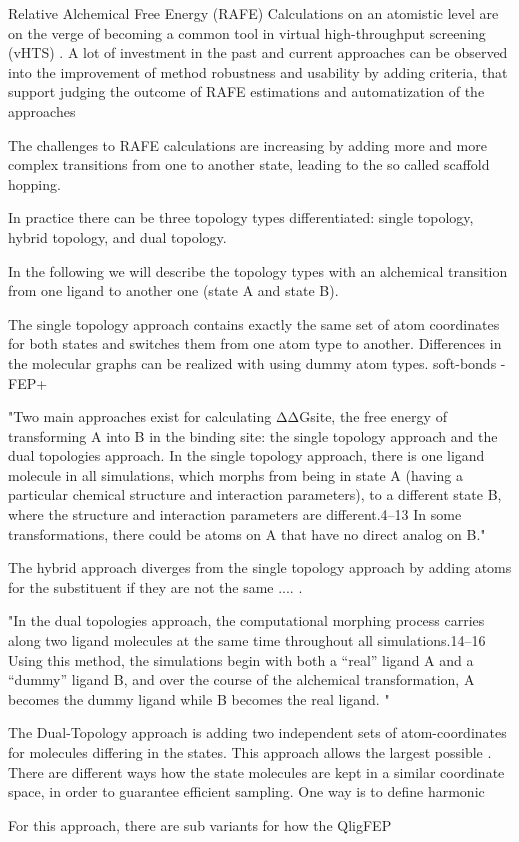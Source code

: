 Relative Alchemical Free Energy (RAFE) Calculations on an atomistic level are on the verge of becoming a common tool in virtual high-throughput screening (vHTS) \cite{Cournia2017}. 
A lot of investment in the past and current approaches can be observed into the improvement of method robustness and usability by adding criteria, that support judging the outcome of RAFE estimations and automatization of the approaches

The challenges to RAFE calculations are increasing by adding more and more complex transitions from one to another state, leading to the so called scaffold hopping. 

In practice there can be three topology types differentiated: single topology, hybrid topology, and dual topology.



In the following we will describe the topology types with an alchemical transition from one ligand to another one (state A and state B).

The single topology approach contains exactly the same set of atom coordinates for both states and switches them from one atom type to another. Differences in the molecular graphs can be realized with using dummy atom types.
soft-bonds - FEP+ \cite{Wang2017, Yu2017, Shivakumar2010}

"Two main approaches exist for calculating ΔΔGsite, the free energy of transforming A into B in the binding site: the single topology approach and the dual topologies approach. In the single topology approach, there is one ligand molecule in all simulations, which morphs from being in state A (having a particular chemical structure and interaction parameters), to a different state B, where the structure and interaction parameters are different.4–13 In some transformations, there could be atoms on A that have no direct analog on B." \cite{Rocklin2013}

The hybrid approach diverges from the single topology approach by adding atoms for the substituent if they are not the same .... \cite{}.

"In the dual topologies approach, the computational morphing process carries along two ligand molecules at the same time throughout all simulations.14–16 Using this method, the simulations begin with both a “real” ligand A and a “dummy” ligand B, and over the course of the alchemical transformation, A becomes the dummy ligand while B becomes the real ligand. "
\cite{Rocklin2013}

The Dual-Topology approach is adding two independent sets of atom-coordinates for molecules differing in the states. This approach allows the largest possible .
There are different ways how the state molecules are kept in a similar coordinate space, in order to guarantee efficient sampling.  
One way is to define harmonic  

For this approach, there are sub variants for how the 
QligFEP \cite{Jespers2019}


